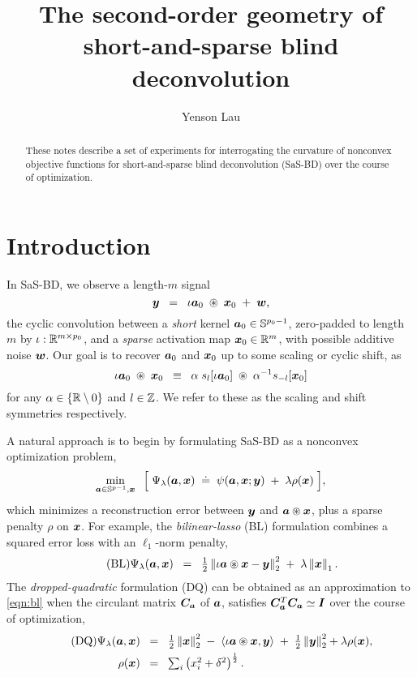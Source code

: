 \documentclass{article}
\title{The second-order geometry of \\ short-and-sparse blind deconvolution}
\author{Yenson Lau}
\numberwithin{equation}{section}
\begin{document}
\maketitle

\begin{abstract}
  These notes describe a set of experiments for interrogating the curvature of nonconvex objective functions for short-and-sparse blind deconvolution (SaS-BD) over the course of optimization.
\end{abstract}

\section{Introduction}
In SaS-BD, we observe a length-$m$ signal
\begin{equation*}
  \boldsymbol{y} \;\;=\;\; \iota\boldsymbol{a}_0 \;\circledast\; \boldsymbol{x}_0 \;+\; \boldsymbol{w},
\end{equation*}
the cyclic convolution between a {\em short} kernel $\boldsymbol{a}_0\in\mathbb{S}^{p_0-1}$, zero-padded to length $m$ by $\iota:\mathbb{R}^{m\times p_0}$, and a {\em sparse} activation map $\boldsymbol{x}_0\in\mathbb{R}^m$, with possible additive noise $\boldsymbol{w}$. Our goal is to recover $\boldsymbol{a}_0$ and $\boldsymbol{x}_0$ up to some scaling or cyclic shift, as
\begin{equation*}
  \iota\boldsymbol{a}_0 \;\circledast\; \boldsymbol{x}_0 \;\;\equiv\;\;
  \alpha\;s_l[\iota\boldsymbol{a}_0] \;\circledast\; \alpha^{-1} s_{-l}[\boldsymbol{x}_0]
\end{equation*}
for any $\alpha\in\left\{ \mathbb{R}\setminus0\right\}$ and $l\in\mathbb{Z}$. We refer to these as the scaling and shift symmetries respectively.

A natural approach is to begin by formulating SaS-BD as a nonconvex optimization problem,
\begin{equation} \label{eqn:obj-Psi}
  \min_{\boldsymbol{a} \in \mathbb{S}^{p-1}, \boldsymbol{x}} \;\;\Big[\;
    \Psi_\lambda(\boldsymbol{a}, \boldsymbol{x}) \;\doteq\; \psi(\boldsymbol{a}, \boldsymbol{x} ; \boldsymbol{y})
    \;+\; \lambda\rho(\boldsymbol{x})
  \;\Big],
\end{equation}
which minimizes a reconstruction error between $\boldsymbol{y}$ and $\boldsymbol{a}\circledast\boldsymbol{x}$, plus a sparse penalty $\rho$ on $\boldsymbol{x}$. For example, the {\em bilinear-lasso} (BL) formulation combines a squared error loss with an $\ell_1$-norm penalty,
\begin{equation} \tag{BL} \label{eqn:bl}
  \Psi_\lambda(\boldsymbol{a},\boldsymbol{x}) \;\;=\;\; \tfrac12\left\lVert \iota\boldsymbol{a}\circledast\boldsymbol{x}-\boldsymbol{y}\right\rVert_2^2 \;+\; \lambda\left\lVert \boldsymbol{x}\right\rVert_1.
\end{equation}
The {\em dropped-quadratic} formulation (DQ) can be obtained as an approximation to \eqref{eqn:bl} when the circulant matrix $\boldsymbol{C}_{\boldsymbol{a}}$ of $\boldsymbol{a}$, satisfies $\boldsymbol{C}_{\boldsymbol{a}}^T\boldsymbol{C}_{\boldsymbol{a}} \simeq \boldsymbol{I}$ over the course of optimization,
\begin{align} \tag{DQ} \label{eqn:dq}
  \Psi_\lambda(\boldsymbol{a},\boldsymbol{x}) \;\;&=\;\; \tfrac12\left\lVert \boldsymbol{x}\right\rVert_2^2 \;-\; \left\langle \iota\boldsymbol{a}\circledast \boldsymbol{x}, \boldsymbol{y}\right\rangle \;+\; \tfrac12\left\lVert \boldsymbol{y}\right\rVert_2^2+\lambda\rho(\boldsymbol{x}), \\
  \rho(\boldsymbol{x}) \;\;&=\;\; \textstyle \sum_i \left( x_i^2+\delta^2\right)^{\frac12}.
\end{align}
\end{document}
